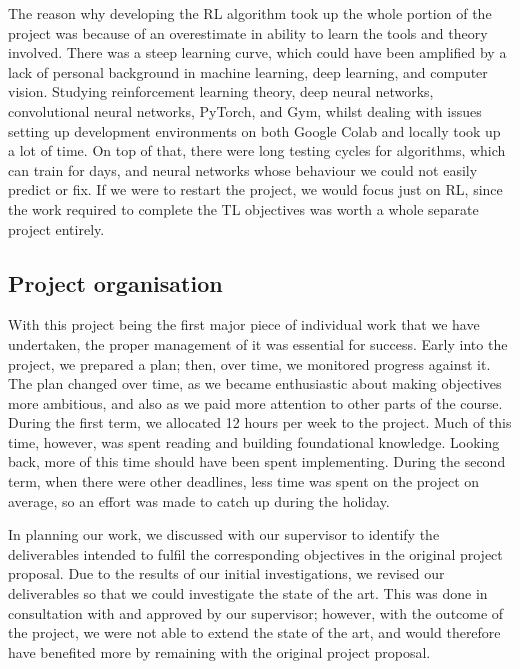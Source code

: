 \documentclass[12pt,a4paper]{article}
\begin{document}
The reason why developing the RL algorithm took up the whole portion of the project was because of an overestimate in ability to learn the tools and theory involved. There was a steep learning curve, which could have been amplified by a lack of personal background in machine learning, deep learning, and computer vision. Studying reinforcement learning theory, deep neural networks, convolutional neural networks, PyTorch, and Gym, whilst dealing with issues setting up development environments on both Google Colab and locally took up a lot of time. On top of that, there were long testing cycles for algorithms, which can train for days, and neural networks whose behaviour we could not easily predict or fix. If we were to restart the project, we would focus just on RL, since the work required to complete the TL objectives was worth a whole separate project entirely.

\subsection{Project organisation}
With this project being the first major piece of individual work that we have undertaken, the proper management of it was essential for success. Early into the project, we prepared a plan; then, over time, we monitored progress against it. The plan changed over time, as we became enthusiastic about making objectives more ambitious, and also as we paid more attention to other parts of the course. During the first term, we allocated 12 hours per week to the project. Much of this time, however, was spent reading and building foundational knowledge. Looking back, more of this time should have been spent implementing. During the second term, when there were other deadlines, less time was spent on the project on average, so an effort was made to catch up during the holiday. 

In planning our work, we discussed with our supervisor to identify the deliverables intended to fulfil the corresponding objectives in the original project proposal. Due to the results of our initial investigations, we revised our deliverables so that we could investigate the state of the art. This was done in consultation with and approved by our supervisor; however, with the outcome of the project, we were not able to extend the state of the art, and would therefore have benefited more by remaining with the original project proposal. 
\end{document}
